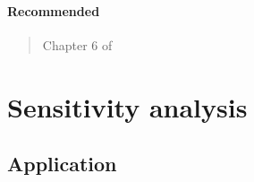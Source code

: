 \documentclass[12pt]{article}
\begin{document}
\begin{verse}  \end{verse}

\begin{verse}  \end{verse}

\begin{verse}  \end{verse}

\paragraph*{Recommended}

\begin{verse}  \end{verse}

\begin{verse}  \end{verse}

\begin{verse}  \end{verse}

\begin{verse}  \end{verse}

\begin{verse}  \end{verse}

\begin{verse}  \end{verse}

\begin{verse}  \end{verse}

\begin{verse}  \end{verse}

\begin{verse} Chapter 6 of  \end{verse}

\section{Sensitivity analysis}

\subsection*{Application}
\end{document}
